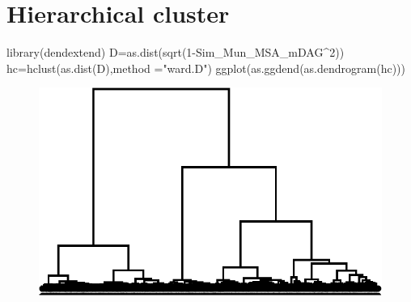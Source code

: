 \documentclass[
  letterpaper,
  DIV=11,
  numbers=noendperiod]{scrreprt}
\newenvironment{Shaded}{\begin{snugshade}}{\end{snugshade}}
\newcommand{\AttributeTok}[1]{\textcolor[rgb]{0.40,0.45,0.13}{#1}}
\newcommand{\DecValTok}[1]{\textcolor[rgb]{0.68,0.00,0.00}{#1}}
\newcommand{\FunctionTok}[1]{\textcolor[rgb]{0.28,0.35,0.67}{#1}}
\newcommand{\NormalTok}[1]{\textcolor[rgb]{0.00,0.23,0.31}{#1}}
\newcommand{\OtherTok}[1]{\textcolor[rgb]{0.00,0.23,0.31}{#1}}
\newcommand{\SpecialCharTok}[1]{\textcolor[rgb]{0.37,0.37,0.37}{#1}}
\newcommand{\StringTok}[1]{\textcolor[rgb]{0.13,0.47,0.30}{#1}}
\begin{document}

\hypertarget{hierarchical-cluster-1}{%
\chapter{Hierarchical cluster}\label{hierarchical-cluster-1}}

\begin{Shaded}
\begin{Highlighting}[]
\FunctionTok{library}\NormalTok{(dendextend)}
\NormalTok{D}\OtherTok{=}\FunctionTok{as.dist}\NormalTok{(}\FunctionTok{sqrt}\NormalTok{(}\DecValTok{1}\SpecialCharTok{{-}}\NormalTok{Sim\_Mun\_MSA\_mDAG}\SpecialCharTok{\^{}}\DecValTok{2}\NormalTok{))}
\NormalTok{hc}\OtherTok{=}\FunctionTok{hclust}\NormalTok{(}\FunctionTok{as.dist}\NormalTok{(D),}\AttributeTok{method =}\StringTok{"ward.D"}\NormalTok{)}
\FunctionTok{ggplot}\NormalTok{(}\FunctionTok{as.ggdend}\NormalTok{(}\FunctionTok{as.dendrogram}\NormalTok{(hc)))}
\end{Highlighting}
\end{Shaded}

\begin{figure}[H]

{\centering \includegraphics{./data_medag_20230321_long_report_files/figure-pdf/unnamed-chunk-18-1.pdf}

}

\end{figure}

\begin{Shaded}
\end{Shaded}
\end{document}
